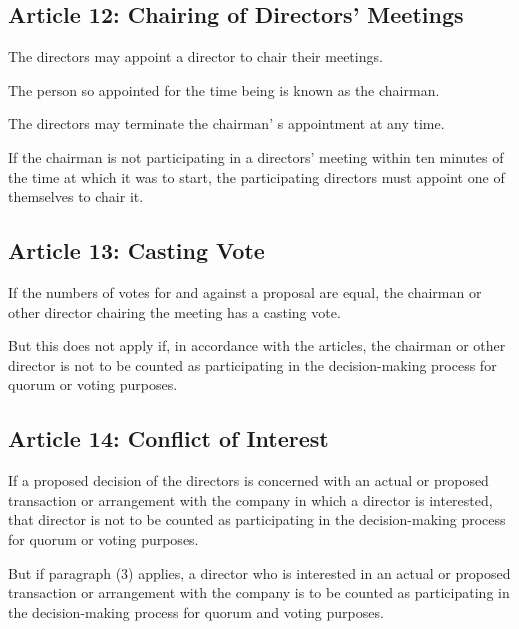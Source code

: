 \documentclass[letterpaper,10pt,english]{sphinxmanual}
\begin{document}
\subsection{Article 12: Chairing of Directors’ Meetings}
\label{\detokenize{directors:article-12-chairing-of-directors-meetings}}\label{\detokenize{directors:article-12}}
 The directors may appoint a director to chair their meetings.

 The person so appointed for the time being is known as the chairman.

 The directors may terminate the chairman’ s appointment at any time.

 If the chairman is not participating in a directors’ meeting within ten minutes of the time at which it was to start, the participating directors must appoint one of themselves to chair it.


\subsection{Article 13: Casting Vote}
\label{\detokenize{directors:article-13-casting-vote}}\label{\detokenize{directors:article-13}}
 If the numbers of votes for and against a proposal are equal, the chairman or other director chairing the meeting has a casting vote.

 But this does not apply if, in accordance with the articles, the chairman or other director is not to be counted as participating in the decision-making process for quorum or voting purposes.


\subsection{Article 14: Conflict of Interest}
\label{\detokenize{directors:article-14-conflict-of-interest}}\label{\detokenize{directors:article-14}}
 If a proposed decision of the directors is concerned with an actual or proposed transaction or arrangement with the company in which a director is interested, that director is not to be counted as participating in the decision-making process for quorum or voting purposes.

 But if paragraph (3) applies, a director who is interested in an actual or proposed transaction or arrangement with the company is to be counted as participating in the decision-making process for quorum and voting purposes.
\end{document}
